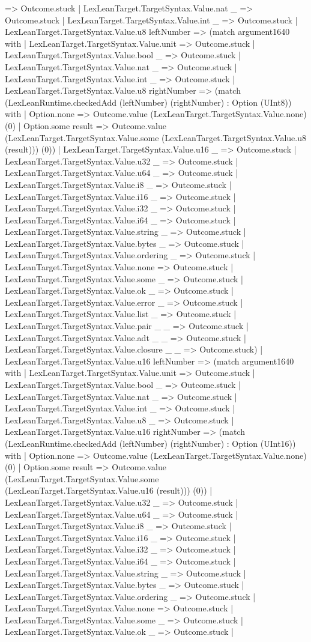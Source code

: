 \documentclass[11pt]{article}
\begin{document}
=> Outcome.stuck | LexLeanTarget.TargetSyntax.Value.nat \_ => Outcome.stuck | LexLeanTarget.TargetSyntax.Value.int \_ => Outcome.stuck | LexLeanTarget.TargetSyntax.Value.u8 leftNumber => (match argument1640 with | LexLeanTarget.TargetSyntax.Value.unit => Outcome.stuck | LexLeanTarget.TargetSyntax.Value.bool \_ => Outcome.stuck | LexLeanTarget.TargetSyntax.Value.nat \_ => Outcome.stuck | LexLeanTarget.TargetSyntax.Value.int \_ => Outcome.stuck | LexLeanTarget.TargetSyntax.Value.u8 rightNumber => (match (LexLeanRuntime.checkedAdd (leftNumber) (rightNumber) : Option (UInt8)) with | Option.none => Outcome.value (LexLeanTarget.TargetSyntax.Value.none) (0) | Option.some result => Outcome.value (LexLeanTarget.TargetSyntax.Value.some (LexLeanTarget.TargetSyntax.Value.u8 (result))) (0)) | LexLeanTarget.TargetSyntax.Value.u16 \_ => Outcome.stuck | LexLeanTarget.TargetSyntax.Value.u32 \_ => Outcome.stuck | LexLeanTarget.TargetSyntax.Value.u64 \_ => Outcome.stuck | LexLeanTarget.TargetSyntax.Value.i8 \_ => Outcome.stuck | LexLeanTarget.TargetSyntax.Value.i16 \_ => Outcome.stuck | LexLeanTarget.TargetSyntax.Value.i32 \_ => Outcome.stuck | LexLeanTarget.TargetSyntax.Value.i64 \_ => Outcome.stuck | LexLeanTarget.TargetSyntax.Value.string \_ => Outcome.stuck | LexLeanTarget.TargetSyntax.Value.bytes \_ => Outcome.stuck | LexLeanTarget.TargetSyntax.Value.ordering \_ => Outcome.stuck | LexLeanTarget.TargetSyntax.Value.none => Outcome.stuck | LexLeanTarget.TargetSyntax.Value.some \_ => Outcome.stuck | LexLeanTarget.TargetSyntax.Value.ok \_ => Outcome.stuck | LexLeanTarget.TargetSyntax.Value.error \_ => Outcome.stuck | LexLeanTarget.TargetSyntax.Value.list \_ => Outcome.stuck | LexLeanTarget.TargetSyntax.Value.pair \_ \_ => Outcome.stuck | LexLeanTarget.TargetSyntax.Value.adt \_ \_ => Outcome.stuck | LexLeanTarget.TargetSyntax.Value.closure \_ \_ => Outcome.stuck) | LexLeanTarget.TargetSyntax.Value.u16 leftNumber => (match argument1640 with | LexLeanTarget.TargetSyntax.Value.unit => Outcome.stuck | LexLeanTarget.TargetSyntax.Value.bool \_ => Outcome.stuck | LexLeanTarget.TargetSyntax.Value.nat \_ => Outcome.stuck | LexLeanTarget.TargetSyntax.Value.int \_ => Outcome.stuck | LexLeanTarget.TargetSyntax.Value.u8 \_ => Outcome.stuck | LexLeanTarget.TargetSyntax.Value.u16 rightNumber => (match (LexLeanRuntime.checkedAdd (leftNumber) (rightNumber) : Option (UInt16)) with | Option.none => Outcome.value (LexLeanTarget.TargetSyntax.Value.none) (0) | Option.some result => Outcome.value (LexLeanTarget.TargetSyntax.Value.some (LexLeanTarget.TargetSyntax.Value.u16 (result))) (0)) | LexLeanTarget.TargetSyntax.Value.u32 \_ => Outcome.stuck | LexLeanTarget.TargetSyntax.Value.u64 \_ => Outcome.stuck | LexLeanTarget.TargetSyntax.Value.i8 \_ => Outcome.stuck | LexLeanTarget.TargetSyntax.Value.i16 \_ => Outcome.stuck | LexLeanTarget.TargetSyntax.Value.i32 \_ => Outcome.stuck | LexLeanTarget.TargetSyntax.Value.i64 \_ => Outcome.stuck | LexLeanTarget.TargetSyntax.Value.string \_ => Outcome.stuck | LexLeanTarget.TargetSyntax.Value.bytes \_ => Outcome.stuck | LexLeanTarget.TargetSyntax.Value.ordering \_ => Outcome.stuck | LexLeanTarget.TargetSyntax.Value.none => Outcome.stuck | LexLeanTarget.TargetSyntax.Value.some \_ => Outcome.stuck | LexLeanTarget.TargetSyntax.Value.ok \_ => Outcome.stuck | 
\end{document}
